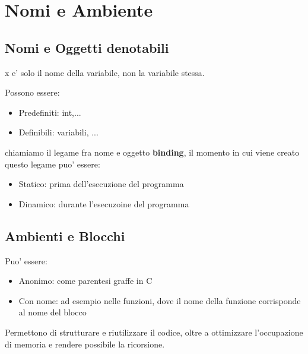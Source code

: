 
\chapter{Nomi e Ambiente}

\section{Nomi e Oggetti denotabili}

x e' solo il nome della variabile, non la variabile stessa. 


Possono essere:
\begin{itemize}
\item Predefiniti: int,...
  \item Definibili: variabili, ...
\end{itemize}

chiamiamo il legame fra nome e oggetto \textbf{binding}, il momento in cui viene creato questo legame puo' essere:
\begin{itemize}
\item Statico: prima dell'esecuzione del programma
\item Dinamico: durante l'esecuzoine del programma
\end{itemize}

\section{Ambienti e Blocchi}



Puo' essere:
\begin{itemize}
\item Anonimo: come parentesi graffe in C 
\item Con nome: ad esempio nelle funzioni, dove il nome della funzione corrisponde al nome del blocco
\end{itemize}

Permettono di strutturare e riutilizzare il codice, oltre a ottimizzare l'occupazione di memoria e rendere possibile la ricorsione. 

